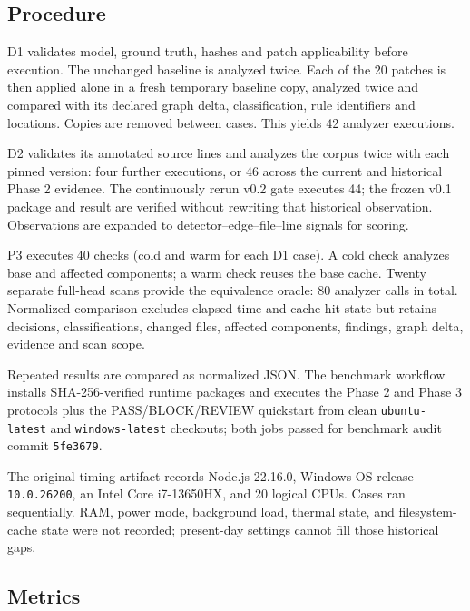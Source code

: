 \documentclass[conference]{IEEEtran}
\begin{document}
\subsection{Procedure}

D1 validates model, ground truth, hashes and patch applicability before execution. The unchanged baseline is analyzed twice. Each of the 20 patches is then applied alone in a fresh temporary baseline copy, analyzed twice and compared with its declared graph delta, classification, rule identifiers and locations. Copies are removed between cases. This yields 42 analyzer executions.

D2 validates its annotated source lines and analyzes the corpus twice with each pinned version: four further executions, or 46 across the current and historical Phase 2 evidence. The continuously rerun v0.2 gate executes 44; the frozen v0.1 package and result are verified without rewriting that historical observation. Observations are expanded to detector--edge--file--line signals for scoring.

P3 executes 40 checks (cold and warm for each D1 case). A cold check analyzes base and affected components; a warm check reuses the base cache. Twenty separate full-head scans provide the equivalence oracle: 80 analyzer calls in total. Normalized comparison excludes elapsed time and cache-hit state but retains decisions, classifications, changed files, affected components, findings, graph delta, evidence and scan scope.

Repeated results are compared as normalized JSON. The benchmark workflow installs SHA-256-verified runtime packages and executes the Phase 2 and Phase 3 protocols plus the PASS/BLOCK/REVIEW quickstart from clean \texttt{ubuntu-latest} and \texttt{windows-latest} checkouts; both jobs passed for benchmark audit commit \texttt{5fe3679}.

The original timing artifact records Node.js 22.16.0, Windows OS release \texttt{10.0.26200}, an Intel Core i7-13650HX, and 20 logical CPUs. Cases ran sequentially. RAM, power mode, background load, thermal state, and filesystem-cache state were not recorded; present-day settings cannot fill those historical gaps.

\subsection{Metrics}
\end{document}
